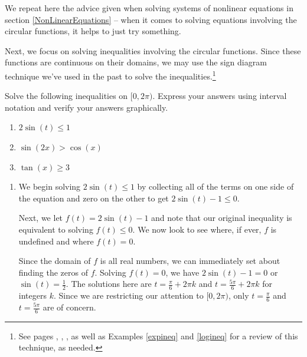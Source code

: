 \documentclass{ximera}
\begin{document}
We repeat here the advice given when solving systems of nonlinear equations in section \ref{NonLinearEquations} --  when it comes to solving equations involving the circular functions, it helps to just try something.  

 

Next, we focus on solving inequalities involving the circular functions.  Since these functions are continuous on their domains, we may use the sign diagram technique we've used in the past to solve the inequalities.\footnote{See pages \pageref{firstsigndiagram}, \pageref{rationalsigndiagram},  \pageref{algebraicsigndiagram}, as well as Examples \ref{expineq} and \ref{logineq} for a review of this technique, as needed.}

\begin{example}  \label{TrigIneqEx1} Solve the following inequalities on $[0,2\pi)$.  Express your answers using interval notation and verify your answers graphically.

\begin{enumerate}

\item  $2\sin(t) \leq 1$

\item  $\sin(2x) > \cos(x)$

\item  $\tan(x) \geq 3$

\end{enumerate}



\begin{explanation}

\begin{enumerate}

\item  We begin solving $2\sin(t) \leq 1$ by collecting all of the terms on one side of the equation and zero on the other to get $2\sin(t) - 1 \leq 0$.  

 

Next, we let $f(t) = 2\sin(t) - 1$ and note that our original inequality is equivalent to solving $f(t) \leq 0$. We now look to see where, if ever, $f$ is undefined and where $f(t) = 0$.  

 

Since the domain of $f$ is all real numbers, we can immediately set  about finding the zeros of $f$.  Solving $f(t) = 0$, we have $2\sin(t) - 1=0$ or $\sin(t) = \frac{1}{2}$.  The solutions here are $t = \frac{\pi}{6} + 2\pi k$ and $t = \frac{5\pi}{6} + 2\pi k$ for integers $k$.  Since we are restricting our attention to $[0,2\pi)$, only $t = \frac{\pi}{6}$ and $t = \frac{5\pi}{6}$ are of concern.


\end{enumerate}
\end{explanation}
\end{example}
\end{document}
